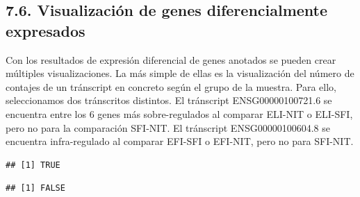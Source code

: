 \documentclass[
]{article}
\newenvironment{Shaded}{\begin{snugshade}}{\end{snugshade}}
\newcommand{\DecValTok}[1]{\textcolor[rgb]{0.00,0.00,0.81}{#1}}
\newcommand{\KeywordTok}[1]{\textcolor[rgb]{0.13,0.29,0.53}{\textbf{#1}}}
\newcommand{\NormalTok}[1]{#1}
\newcommand{\OperatorTok}[1]{\textcolor[rgb]{0.81,0.36,0.00}{\textbf{#1}}}
\newcommand{\StringTok}[1]{\textcolor[rgb]{0.31,0.60,0.02}{#1}}
\begin{document}
\hypertarget{visualizaciuxf3n-de-genes-diferencialmente-expresados}{%
\subsection{7.6. Visualización de genes diferencialmente
expresados}\label{visualizaciuxf3n-de-genes-diferencialmente-expresados}}

Con los resultados de expresión diferencial de genes anotados se pueden
crear múltiples visualizaciones. La más simple de ellas es la
visualización del número de contajes de un tránscript en concreto según
el grupo de la muestra. Para ello, seleccionamos dos tránscritos
distintos. El tránscript ENSG00000100721.6 se encuentra entre los 6
genes más sobre-regulados al comparar ELI-NIT o ELI-SFI, pero no para la
comparación SFI-NIT. El tránscript ENSG00000100604.8 se encuentra
infra-regulado al comparar EFI-SFI o EFI-NIT, pero no para SFI-NIT.

\begin{Shaded}
\end{Shaded}

\begin{verbatim}
## [1] TRUE
\end{verbatim}

\begin{Shaded}
\end{Shaded}

\begin{verbatim}
## [1] FALSE
\end{verbatim}

\begin{Shaded}
\end{Shaded}
\end{document}
